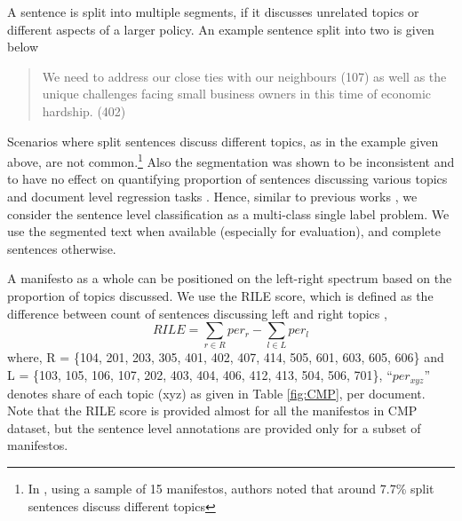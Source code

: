 \documentclass[11pt,a4paper]{article}
\begin{document}
A sentence is split into multiple segments, if it discusses unrelated topics or different aspects of a larger policy. An example sentence split into two is given below
\begin{quote}
\color{red}
We need to address our close ties with our neighbours (107) \color{blue} as well as the unique challenges facing small business owners in this time of economic hardship. (402)
\end{quote}
Scenarios where split sentences discuss different topics, as in the example given above, are not common.\footnote{In \cite{daubler2012natural}, using a sample of 15 manifestos, authors noted that around 7.7\% split sentences discuss different topics} Also the segmentation was shown to be inconsistent and to have no effect on quantifying proportion of sentences discussing various topics and document level regression tasks \cite{daubler2012natural}. Hence, similar to previous works \cite{biessmann2016automating, W17-2906}, we consider the sentence level classification as a multi-class single label problem. We use the segmented text when available (especially for evaluation), and complete sentences otherwise.

A manifesto as a whole can be positioned on the left-right spectrum based on the proportion of topics discussed. We use the RILE score, which is defined as the difference between count of sentences discussing left and right topics \cite{cat}, 
\begin{equation}
RILE = \sum_{r \in R} per_{r} - \sum_{l \in L} per_{l}
\end{equation}
where, R = \{104, 201, 203, 305, 401, 402, 407, 414, 505, 601, 603, 605, 606\} and L = \{103, 105, 106, 107, 202, 403, 404, 406, 412, 413, 504, 506, 701\}, ``$per_{xyz}$'' denotes share of each topic (xyz) as given in Table \ref{fig:CMP}, per document.  Note that the RILE score is provided almost for all the manifestos in CMP dataset, but the sentence level annotations are provided only for a subset of manifestos. 
\end{document}
